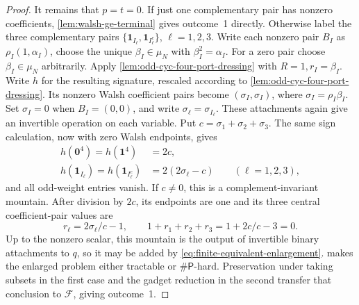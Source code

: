 \documentclass[11pt,letterpaper,onecolumn]{article}
\theoremstyle{plain}
\theoremstyle{definition}
\theoremstyle{remark}
\newcommand{\cF}{\mathcal F}
\newcommand{\SharpP}{\#\mathsf P}
\newcommand{\one}{\mathbf 1}
\newcommand{\zero}{\mathbf 0}
\begin{document}
\begin{proof}
		It remains that \(p=t=0\).  If just one complementary pair has nonzero coefficients,
		\cref{lem:walsh-ge-terminal} gives outcome~1 directly.  Otherwise label the three complementary pairs
		\(\{\one_{I_\ell},\one_{I_\ell^c}\}\), \(\ell=1,2,3\).
		Write each nonzero pair \(B_I\) as
		\(\rho_I(1,\alpha_I)\), choose the unique \(\beta_I\in\mu_N\) with
		\(\beta_I^2=\alpha_I\). For a zero pair choose \(\beta_I\in\mu_N\)
		arbitrarily.  Apply \cref{lem:odd-cyc-four-port-dressing} with
		\(R=1,r_I=\beta_I\).  Write \(h\) for the resulting signature, rescaled according to
		\cref{lem:odd-cyc-four-port-dressing}.  Its nonzero Walsh coefficient pairs
		become \((\sigma_I,\sigma_I)\), where
		\(\sigma_I=\rho_I\beta_I\). Set \(\sigma_I=0\) when \(B_I=(0,0)\), and write
		\(\sigma_\ell=\sigma_{I_\ell}\).  These attachments again give an invertible operation on each variable.  Put \(c=\sigma_1+\sigma_2+\sigma_3\).  The same sign
		calculation, now with zero Walsh endpoints, gives
		\[
		\begin{aligned}
			h(\zero^4)=h(\one^4)&=2c,\\
			h(\one_{I_\ell})=h(\one_{I_\ell^c})
			&=2(2\sigma_\ell-c)\qquad(\ell=1,2,3),
		\end{aligned}
		\]
		and all odd-weight entries vanish.  If \(c\ne0\), this is a
		complement-invariant mountain. After division by \(2c\), its endpoints
		are one and its three central coefficient-pair values are
		\[
		r_\ell=2\sigma_\ell/c-1,
		\qquad 1+r_1+r_2+r_3=1+2c/c-3=0.
		\]
		Up to the nonzero scalar, this mountain is the output of invertible binary
		attachments to \(q\), so it may be
		added by \cref{eq:finite-equivalent-enlargement}.
		 makes the enlarged problem either
		tractable or \(\SharpP\)-hard.  Preservation under taking subsets in the first case and
		the gadget reduction in the second transfer that conclusion to
		\(\cF\), giving outcome~1.
		

\end{proof}
\end{document}
